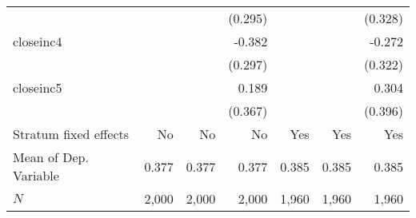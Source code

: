 \begin{tabular}{lrrrrrr}
                      &         &           &   (0.295) &         &           &   (0.328) \\ 
closeinc4             &         &           &    -0.382 &         &           &    -0.272 \\ 
                      &         &           &   (0.297) &         &           &   (0.322) \\ 
closeinc5             &         &           &     0.189 &         &           &     0.304 \\ 
                      &         &           &   (0.367) &         &           &   (0.396) \\ 
\midrule
Stratum fixed effects &      No &        No &        No &     Yes &       Yes &       Yes \\ 
Mean of Dep. Variable &   0.377 &     0.377 &     0.377 &   0.385 &     0.385 &     0.385 \\ 
$N$                   &   2,000 &     2,000 &     2,000 &   1,960 &     1,960 &     1,960 \\ 
\bottomrule
\end{tabular}
